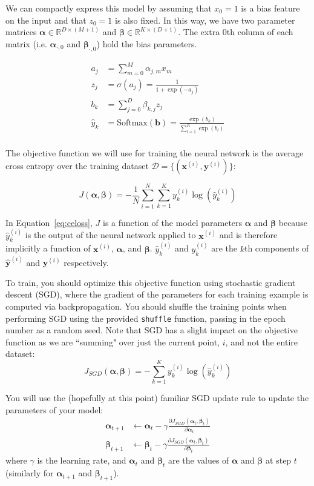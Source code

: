 \documentclass[11pt,addpoints,answers]{exam}
\newcommand{\Dc}{\mathcal{D}}
\newcommand{\Rb}{\mathbb{R}}
\newcommand{\xv}{\mathbf{x}}
\newcommand{\yv}{\mathbf{y}}
\newcommand{\alphav     }{\boldsymbol \alpha     }
\newcommand{\betav      }{\boldsymbol \beta      }
\begin{document}
We can compactly express this model by assuming that $x_0=1$ is a bias feature on the input and that $z_0=1$ is also fixed. In this way, we have two parameter matrices $\alphav \in \Rb^{D \times (M+1)}$ and $\betav \in \Rb^{K \times (D+1)}$. The extra $0$th column of each matrix (i.e. $\alphav_{\cdot, 0}$ and $\betav_{\cdot, 0}$) hold the bias parameters.

\begin{align*}
a_j &= \sum_{m=0}^M \alpha_{j,m} x_m
\\
z_j &= \sigma(a_j) = \frac{1}{1+\exp(-a_j)}
\\
b_k &= \sum_{j=0}^D \beta_{k,j} z_j
\\
\hat{y}_k &= \text{Softmax}(\mathbf{b}) = \frac{\exp(b_k)}{\sum_{l=1}^K \exp(b_l)}
\\
\end{align*}

The objective function we will use for training the neural network is the average cross entropy over the training dataset $\Dc = \{ (\xv^{(i)}, \yv^{(i)}) \}$:

\begin{equation}
\label{eq:celoss}
J(\alphav, \betav)= - \frac{1}{N} \sum_{i=1}^N \sum_{k=1}^{K} y_k^{(i)} \log (\hat{y}^{(i)}_k)
\end{equation}

In Equation~\ref{eq:celoss}, $J$ is a function of the model parameters $\alphav$ and $\betav$ because $\hat{y}^{(i)}_k$ is the output of the neural network applied to $\xv^{(i)}$ and is therefore implicitly a function of $\xv^{(i)}$, $\alphav$, and $\betav$. $\hat{y}^{(i)}_k$ and $y_k^{(i)}$ are the $k$th components of $\hat{\yv}^{(i)}$ and $\yv^{(i)}$ respectively.

To train, you should optimize this objective function using stochastic gradient descent (SGD), where the gradient of the parameters for each training example is computed via backpropagation. You should shuffle the training points when performing SGD using the provided \verb|shuffle| function, passing in the epoch number as a random seed. Note that SGD has a slight impact on the objective function as we are ``summing" over just the current point, $i$, and not the entire dataset:
\begin{equation}
\label{eq:sgd_celoss}
J_{SGD}(\alphav, \betav)= -\sum_{k=1}^{K} y_k^{(i)} \log (\hat{y}^{(i)}_k)
\end{equation}

You will use the (hopefully at this point) familiar SGD update rule to update the parameters of your model:
\begin{align}
\label{eq:sgd_update}
\alphav_{t+1} &\leftarrow \alphav_t - \gamma \frac{\partial J_{SGD}(\alphav_t, \betav_t)}{\partial \alphav_t} \\
\betav_{t+1} &\leftarrow \betav_t - \gamma \frac{\partial J_{SGD}(\alphav_t, \betav_t)}{\partial \betav_t}
\end{align}
where $\gamma$ is the learning rate, and $\alphav_t$ and $\betav_t$ are the values of $\alphav$ and $\betav$ at step $t$ (similarly for $\alphav_{t+1}$ and $\betav_{t+1}$).
\end{document}
